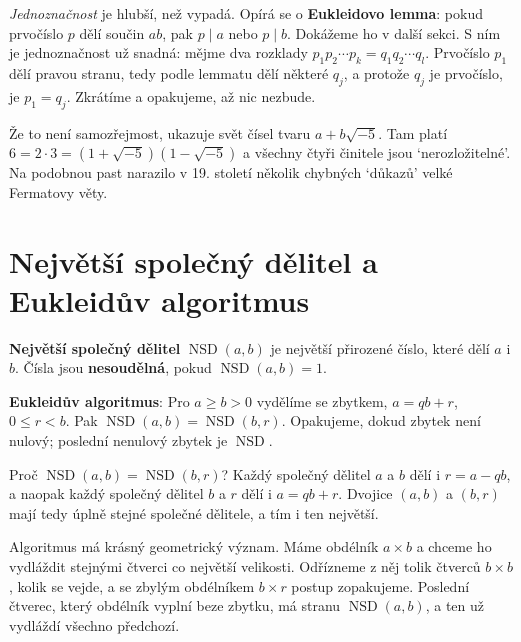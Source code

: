 \textit{Jednoznačnost} je hlubší, než vypadá. Opírá se o \textbf{Eukleidovo lemma}: pokud prvočíslo $p$ dělí součin $ab$, pak $p\mid a$ nebo $p\mid b$. Dokážeme ho v další sekci. S ním je jednoznačnost už snadná: mějme dva rozklady $p_1p_2\cdots p_k = q_1q_2\cdots q_l$. Prvočíslo $p_1$ dělí pravou stranu, tedy podle lemmatu dělí některé $q_j$, a protože $q_j$ je prvočíslo, je $p_1 = q_j$. Zkrátíme a opakujeme, až nic nezbude.

Že to není samozřejmost, ukazuje svět čísel tvaru $a + b\sqrt{-5}$. Tam platí $6 = 2\cdot 3 = (1 + \sqrt{-5})(1 - \sqrt{-5})$ a všechny čtyři činitele jsou `nerozložitelné'. Na podobnou past narazilo v 19. století několik chybných `důkazů' velké Fermatovy věty.

\section{Největší společný dělitel a Eukleidův algoritmus}

\begin{definitionbox}
  \textbf{Největší společný dělitel} $\operatorname{NSD}(a, b)$ je největší přirozené číslo, které dělí $a$ i $b$. Čísla jsou \textbf{nesoudělná}, pokud $\operatorname{NSD}(a, b) = 1$.

  \textbf{Eukleidův algoritmus}: Pro $a\geq b > 0$ vydělíme se zbytkem, $a = qb + r$, $0\leq r < b$. Pak $\operatorname{NSD}(a, b) = \operatorname{NSD}(b, r)$. Opakujeme, dokud zbytek není nulový; poslední nenulový zbytek je $\operatorname{NSD}$.
\end{definitionbox}

Proč $\operatorname{NSD}(a, b) = \operatorname{NSD}(b, r)$? Každý společný dělitel $a$ a $b$ dělí i $r = a - qb$, a naopak každý společný dělitel $b$ a $r$ dělí i $a = qb + r$. Dvojice $(a, b)$ a $(b, r)$ mají tedy úplně stejné společné dělitele, a tím i ten největší.

Algoritmus má krásný geometrický význam. Máme obdélník $a\times b$ a chceme ho vydláždit stejnými čtverci co největší velikosti. Odřízneme z něj tolik čtverců $b\times b$, kolik se vejde, a se zbylým obdélníkem $b\times r$ postup zopakujeme. Poslední čtverec, který obdélník vyplní beze zbytku, má stranu $\operatorname{NSD}(a, b)$, a ten už vydláždí všechno předchozí.

